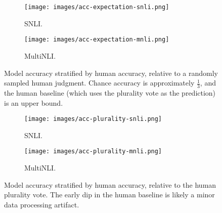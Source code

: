 \documentclass[10pt,a4paper]{article}
\begin{document}

\begin{figure*}[t!]
\centering
\begin{subfigure}[b]{0.45\textwidth}
\texttt{[image: images/acc-expectation-snli.png]}
\caption{SNLI.}
\end{subfigure}
\hfill
\begin{subfigure}[b]{0.45\textwidth}
\texttt{[image: images/acc-expectation-mnli.png]}
\caption{MultiNLI.}
\end{subfigure}
\caption{
  Model accuracy stratified by human accuracy, relative to a randomly sampled human judgment. Chance accuracy is approximately $\frac{1}{3}$, and the human baseline (which uses the plurality vote as the prediction) is an upper bound.\label{fig:acc-graphs}}
\end{figure*}

\begin{figure*}[t!]
\centering
\begin{subfigure}[b]{0.45\textwidth}
\texttt{[image: images/acc-plurality-snli.png]}
\caption{SNLI.}
\end{subfigure}
\hfill
\begin{subfigure}[b]{0.45\textwidth}
\texttt{[image: images/acc-plurality-mnli.png]}
\caption{MultiNLI.}
\end{subfigure}
\caption{
  Model accuracy stratified by human accuracy, relative to the human plurality vote. The early dip in the human baseline is likely a minor data processing artifact.
}
\end{figure*}
\end{document}
